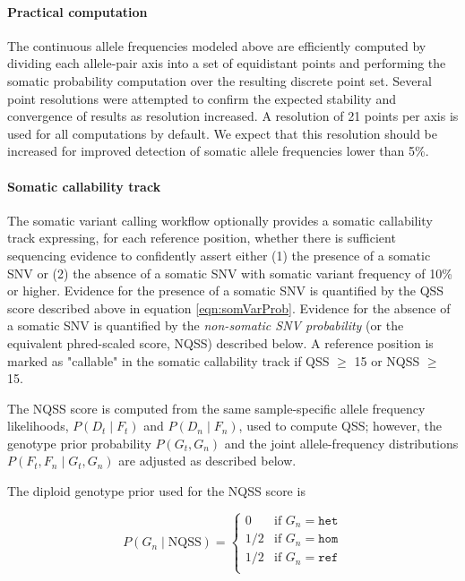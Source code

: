 \documentclass{article}
\begin{document}

\paragraph{Practical computation}

The continuous allele frequencies modeled above are efficiently computed by dividing each allele-pair axis into a set of equidistant points and performing the somatic probability computation over the resulting discrete point set. Several point resolutions were attempted to confirm the expected stability and convergence of results as resolution increased. A resolution of 21 points per axis is used for all computations by default. We expect that this resolution should be increased for improved detection of somatic allele frequencies lower than 5\%.

\paragraph{Somatic callability track}

The somatic variant calling workflow optionally provides a somatic callability track expressing, for each reference position, whether there is sufficient sequencing evidence to confidently assert either (1) the presence of a somatic SNV or (2) the absence of a somatic SNV with somatic variant frequency of 10\% or higher. Evidence for the presence of a somatic SNV is quantified by the QSS score described above in equation \ref{eqn:somVarProb}. Evidence for the absence of a somatic SNV is quantified by the \emph{non-somatic SNV probability} (or the equivalent phred-scaled score, NQSS) described below. A reference position is marked as "callable" in the somatic callability track if QSS $\ge$ 15 or NQSS $\ge$ 15.

The NQSS score is computed from the same sample-specific allele frequency likelihoods, $P(D_t \mid F_t)$ and $P(D_n \mid F_n)$, used to compute QSS; however, the genotype prior probability $P(G_t, G_n)$ and the joint allele-frequency distributions $P(F_t,F_n \mid G_t,G_n)$ are adjusted as described below.

The diploid genotype prior used for the NQSS score is

\begin{equation*}
P(G_n\mid \text{NQSS})=
\begin{cases}
0 & \text{if } G_n = \texttt{het} \\
1/2 & \text{if } G_n = \texttt{hom} \\
1/2 & \text{if } G_n = \texttt{ref} \\
\end{cases}
\end{equation*}
\end{document}
